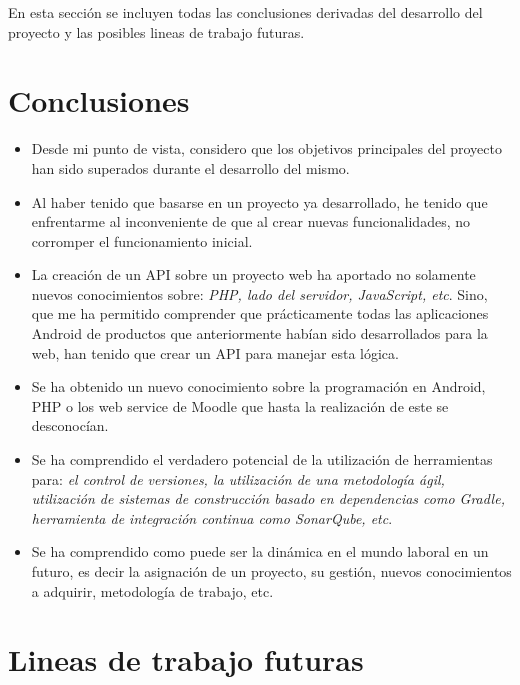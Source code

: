 
En esta sección se incluyen todas las conclusiones derivadas del desarrollo del proyecto y las posibles lineas de trabajo futuras.

\section{Conclusiones}

\begin{itemize}
	\item Desde mi punto de vista, considero que los objetivos principales del proyecto han sido superados durante el desarrollo del mismo.
	
	\item Al haber tenido que basarse en un proyecto ya desarrollado, he tenido que enfrentarme al inconveniente de que al crear nuevas funcionalidades, no corromper el funcionamiento inicial.
	
	\item La creación de un API sobre un proyecto web ha aportado no solamente nuevos conocimientos sobre: \emph{PHP, lado del servidor, JavaScript, etc}. Sino, que me ha permitido comprender que prácticamente todas las aplicaciones Android de productos que anteriormente habían sido desarrollados para la web, han tenido que crear un API para manejar esta lógica.
	
	\item Se ha obtenido un nuevo conocimiento sobre la programación en Android, PHP o los web service de Moodle que hasta la realización de este se desconocían.
	
	\item Se ha comprendido el verdadero potencial de la utilización de herramientas para: \emph{el control de versiones, la utilización de una metodología ágil, utilización de sistemas de construcción basado en dependencias como Gradle, herramienta de integración continua como SonarQube, etc}.
	
	\item Se ha comprendido como puede ser la dinámica en el mundo laboral en un futuro, es decir la asignación de un proyecto, su gestión, nuevos conocimientos a adquirir, metodología de trabajo, etc.
\end{itemize}



\section{Lineas de trabajo futuras}

